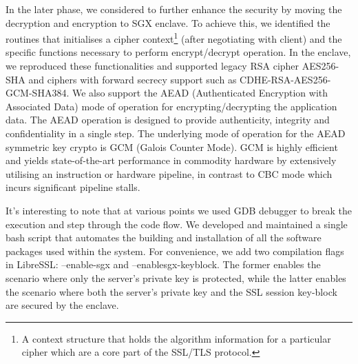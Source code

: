\documentclass[../main.tex]{subfiles}
\begin{document}
In the later phase, we considered to further enhance the security by moving the decryption and encryption
to SGX enclave. To achieve this, we identified the routines that initialises a cipher context\footnote{A 
context structure that holds the algorithm information for a particular cipher which are a core part
of the SSL/TLS protocol.} (after negotiating with client) and the specific functions necessary
to perform encrypt/decrypt operation. In the enclave, we reproduced these functionalities and 
supported legacy RSA cipher AES256-SHA and ciphers with forward secrecy support such as 
CDHE-RSA-AES256-GCM-SHA384. We also support the AEAD (Authenticated Encryption with Associated Data)
mode of operation for encrypting/decrypting the application data. The AEAD operation is designed to 
provide authenticity, integrity and confidentiality in a single step. The underlying mode of operation
for the AEAD symmetric key crypto is GCM (Galois Counter Mode). GCM is highly efficient and yields 
state-of-the-art performance in commodity hardware by extensively utilising an instruction or 
hardware pipeline, in contrast to CBC mode which incurs significant pipeline stalls.

It’s interesting to note that at various points we used GDB debugger to break the execution and
step through the code flow. We developed and maintained a single bash script that automates the 
building and installation of all the software packages used within the system. For convenience, 
we add two compilation flags in LibreSSL: –enable-sgx and –enablesgx-keyblock. The former enables
the scenario where only the server’s private key is protected, while the latter enables the scenario
where both the server’s private key and the SSL session key-block are secured by the enclave.
\end{document}
